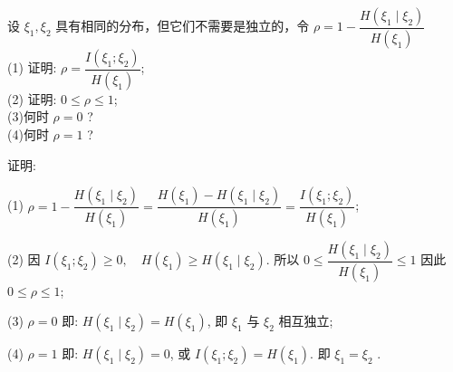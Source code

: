   \begin{exercise}
    设 $ \xi_{1}, \xi_{2} $ 具有相同的分布，但它们不需要是独立的，令 $ \rho=1-\dfrac{H\left(\xi_{1} \mid \xi_{2}\right)}{H\left(\xi_{1}\right)} $\\
(1) 证明: $ \rho=\dfrac{I\left(\xi_{1} ; \xi_{2}\right)}{H\left(\xi_{1}\right)} $;\\
(2) 证明: $ 0 \leqslant \rho \leqslant 1 $;\\
(3)何时 $ \rho=0 $ ?\\
(4)何时 $ \rho=1 $ ?
 \end{exercise}
 \begin{solution}
     证明:
     
(1) $ \rho=1-\dfrac{H\left(\xi_{1} \mid \xi_{2}\right)}{H\left(\xi_{1}\right)}=\dfrac{H\left(\xi_{1}\right)-H\left(\xi_{1} \mid \xi_{2}\right)}{H\left(\xi_{1}\right)}=\dfrac{I\left(\xi_{1} ; \xi_{2}\right)}{H\left(\xi_{1}\right)} $;

(2) 因 $ I\left(\xi_{1} ; \xi_{2}\right) \geqslant 0 ,\quad H\left(\xi_{1}\right) \geqslant H\left(\xi_{1} \mid \xi_{2}\right) $.
所以 $ 0 \leqslant \dfrac{H\left(\xi_{1} \mid \xi_{2}\right)}{H\left(\xi_{1}\right)} \leqslant 1 $
因此 $ 0 \leqslant \rho \leqslant 1 $;

(3) $ \rho=0 $ 即: $ H\left(\xi_{1} \mid \xi_{2}\right)=H\left(\xi_{1}\right) $, 即 $ \xi_{1} $ 与 $ \xi_{2} $ 相互独立;

(4) $ \rho=1 $ 即: $ H\left(\xi_{1} \mid \xi_{2}\right)=0 $, 或 $ I\left(\xi_{1} ; \xi_{2}\right)=H\left(\xi_{1}\right) $.
即 $ \xi_{1}=\xi_{2} $ .
 \end{solution}

